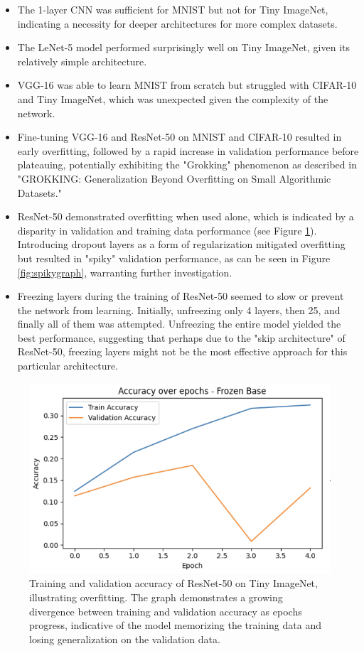 \documentclass[letterpaper]{article}
\begin{document}
\begin{itemize}
    \item The 1-layer CNN was sufficient for MNIST but not for Tiny ImageNet, indicating a necessity for deeper architectures for more complex datasets.
    \item The LeNet-5 model performed surprisingly well on Tiny ImageNet, given its relatively simple architecture.
    \item VGG-16 was able to learn MNIST from scratch but struggled with CIFAR-10 and Tiny ImageNet, which was unexpected given the complexity of the network.
    \item Fine-tuning VGG-16 and ResNet-50 on MNIST and CIFAR-10 resulted in early overfitting, followed by a rapid increase in validation performance before plateauing, potentially exhibiting the "Grokking" phenomenon as described in "GROKKING: Generalization Beyond Overfitting on Small Algorithmic Datasets." \cite{power2022grokking}
    \item ResNet-50 demonstrated overfitting when used alone, which is indicated by a disparity in validation and training data performance (see Figure \ref{fig:overfittinggraph}). Introducing dropout layers as a form of regularization mitigated overfitting but resulted in "spiky" validation performance, as can be seen in Figure \ref{fig:spikygraph}, warranting further investigation.
    \item Freezing layers during the training of ResNet-50 seemed to slow or prevent the network from learning. Initially, unfreezing only 4 layers, then 25, and finally all of them was attempted. Unfreezing the entire model yielded the best performance, suggesting that perhaps due to the "skip architecture" of ResNet-50, freezing layers might not be the most effective approach for this particular architecture.
\end{itemize}
\begin{figure}
    \centering
    \includegraphics[width=0.8\linewidth]{resnet50_tiny_imagenet_overfitting.png}
    \caption{Training and validation accuracy of ResNet-50 on Tiny ImageNet, illustrating overfitting. The graph demonstrates a growing divergence between training and validation accuracy as epochs progress, indicative of the model memorizing the training data and losing generalization on the validation data.}
    \label{fig:overfittinggraph}
\end{figure}
\end{document}
